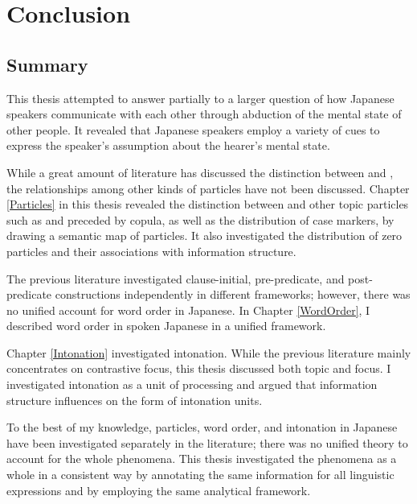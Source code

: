 \chapter{Conclusion}\label{Conclusion}


\section{Summary}

This thesis attempted to answer partially to a larger question of
how Japanese speakers communicate with each other
through abduction of the mental state of other people.
It revealed that Japanese speakers employ a variety of cues to express the speaker's assumption about the hearer's mental state.

While a great amount of literature has discussed the distinction between  and ,
the relationships among other kinds of particles have not been discussed.
Chapter \ref{Particles} in this thesis revealed the distinction between  and other topic particles such as  and  preceded by copula,
as well as the distribution of case markers,
by drawing a semantic map of particles.
It also investigated the distribution of zero particles and their associations with information structure.

The previous literature investigated clause-initial, pre-predicate, and post-predicate constructions independently in different frameworks;
however, there was no unified account for word order in Japanese.
In Chapter \ref{WordOrder},
I described word order in spoken Japanese in a unified framework.

Chapter \ref{Intonation} investigated intonation.
While the previous literature mainly concentrates on contrastive focus,
this thesis discussed both topic and focus.
I investigated intonation as a unit of processing and
argued that information structure influences on the form of intonation units.

To the best of my knowledge,
particles, word order, and intonation in Japanese have been investigated separately in the literature;
there was no unified theory to account for the whole phenomena.
This thesis investigated the phenomena as a whole in a consistent way
by annotating the same information for all linguistic expressions and
by employing the same analytical framework.




